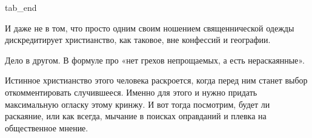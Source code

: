   tab_end
\fi

И даже не в том, что просто одним своим ношением священнической одежды
дискредитирует христианство, как таковое, вне конфессий и географии.

Дело в другом. В формуле про «нет грехов непрощаемых, а есть нераскаянные».

Истинное христианство этого человека раскроется, когда перед ним станет выбор
откомментировать случившееся. Именно для этого и нужно придать максимальную
огласку этому кринжу. И вот тогда посмотрим, будет ли раскаяние, или как
всегда, мычание в поисках оправданий и плевка на общественное мнение.

